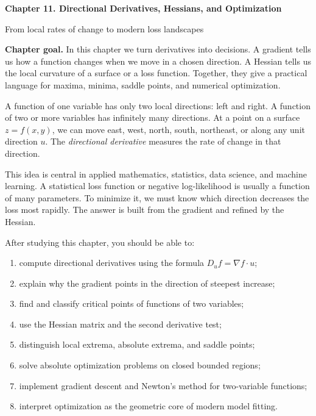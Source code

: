 \documentclass[11pt]{article}
\newcommand{\grad}{\nabla}
\begin{document}
\begin{center}
  {\LARGE\bfseries Chapter 11. Directional Derivatives, Hessians, and Optimization\par}
  \vspace{0.3em}
  {\large From local rates of change to modern loss landscapes\par}
\end{center}

\begin{chaptergoalbox}
\textbf{Chapter goal.} In this chapter we turn derivatives into decisions. A gradient tells us how a function changes when we move in a chosen direction. A Hessian tells us the local curvature of a surface or a loss function. Together, they give a practical language for maxima, minima, saddle points, and numerical optimization.

A function of one variable has only two local directions: left and right. A function of two or more variables has infinitely many directions. At a point on a surface $z=f(x,y)$, we can move east, west, north, south, northeast, or along any unit direction $u$. The \emph{directional derivative} measures the rate of change in that direction.
\end{chaptergoalbox}

This idea is central in applied mathematics, statistics, data science, and machine learning. A statistical loss function or negative log-likelihood is usually a function of many parameters. To minimize it, we must know which direction decreases the loss most rapidly. The answer is built from the gradient and refined by the Hessian.

\begin{goalbox}
After studying this chapter, you should be able to:
\begin{enumerate}
  \item compute directional derivatives using the formula $D_u f=\grad f\cdot u$;
  \item explain why the gradient points in the direction of steepest increase;
  \item find and classify critical points of functions of two variables;
  \item use the Hessian matrix and the second derivative test;
  \item distinguish local extrema, absolute extrema, and saddle points;
  \item solve absolute optimization problems on closed bounded regions;
  \item implement gradient descent and Newton's method for two-variable functions;
  \item interpret optimization as the geometric core of modern model fitting.
\end{enumerate}
\end{goalbox}
\end{document}
